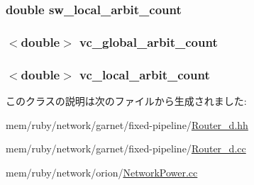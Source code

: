 \label{classRouter__d_a9d9970c29868dc64bf72b49f315a674e}
\hypertarget{classRouter__d_a244af0e1954d860d9ad4333852a24f3f}{
\subsubsection[{sw\_\-local\_\-arbit\_\-count}]{\setlength{\rightskip}{0pt plus 5cm}double {\bf sw\_\-local\_\-arbit\_\-count}}}
\label{classRouter__d_a244af0e1954d860d9ad4333852a24f3f}
\hypertarget{classRouter__d_a2454cc999d0640452a6b6814406ed2ae}{
\subsubsection[{vc\_\-global\_\-arbit\_\-count}]{$<$double$>$ {\bf vc\_\-global\_\-arbit\_\-count}}}
\label{classRouter__d_a2454cc999d0640452a6b6814406ed2ae}
\hypertarget{classRouter__d_af297fe43c51906ad67970540c713829e}{
\subsubsection[{vc\_\-local\_\-arbit\_\-count}]{$<$double$>$ {\bf vc\_\-local\_\-arbit\_\-count}}}
\label{classRouter__d_af297fe43c51906ad67970540c713829e}


このクラスの説明は次のファイルから生成されました:\begin{DoxyCompactItemize}
\item 
mem/ruby/network/garnet/fixed-\/pipeline/\hyperlink{Router__d_8hh}{Router\_\-d.hh}\item 
mem/ruby/network/garnet/fixed-\/pipeline/\hyperlink{Router__d_8cc}{Router\_\-d.cc}\item 
mem/ruby/network/orion/\hyperlink{NetworkPower_8cc}{NetworkPower.cc}\end{DoxyCompactItemize}
